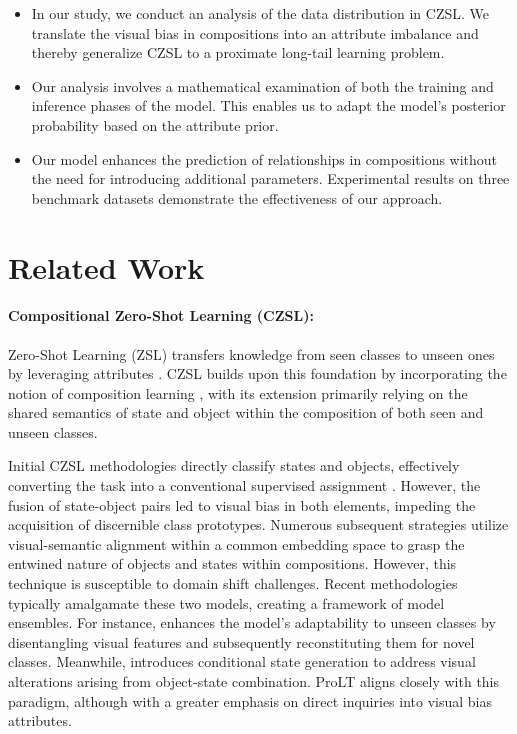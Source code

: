 \documentclass[letterpaper]{article} %
\theoremstyle{definition}
\begin{document}
\begin{itemize}
\item In our study, we conduct an analysis of the data distribution in CZSL. We translate the visual bias in compositions into an attribute imbalance and thereby generalize CZSL to a proximate long-tail learning problem.
\item Our analysis involves a mathematical examination of both the training and inference phases of the model. This enables us to adapt the model's posterior probability based on the attribute prior.
\item Our model enhances the prediction of relationships in compositions without the need for introducing additional parameters. Experimental results on three benchmark datasets demonstrate the effectiveness of our approach.
\end{itemize}


\section{Related Work} \label{sec.related}

\paragraph{Compositional Zero-Shot Learning (CZSL):} Zero-Shot Learning (ZSL) transfers knowledge from seen classes to unseen ones by leveraging attributes \cite{akata2013label, lampert2013attribute, parikh2011relative, frome2013devise, akata2015evaluation}. CZSL \cite{atzmon2020causal, yang2022decomposable,nagarajan2018attributes,wang2019task} builds upon this foundation by incorporating the notion of composition learning \cite{hoffman1984parts}, with its extension primarily relying on the shared semantics of state and object within the composition of both seen and unseen classes.

Initial CZSL methodologies directly classify states and objects, effectively converting the task into a conventional supervised assignment \cite{misra2017red, chen2014inferring, yang2020learning,lu2016visual,li2022siamese}. However, the fusion of state-object pairs led to visual bias in both elements, impeding the acquisition of discernible class prototypes. Numerous subsequent strategies utilize visual-semantic alignment within a common embedding space \cite{naeem2021learning,mancini2022learning,mancini2021open} to grasp the entwined nature of objects and states within compositions. However, this technique is susceptible to domain shift challenges. Recent methodologies typically amalgamate these two models, creating a framework of model ensembles. For instance, \citet{saini2022disentangling} enhances the model's adaptability to unseen classes by disentangling visual features and subsequently reconstituting them for novel classes. Meanwhile, \citet{wang2023learning} introduces conditional state generation to address visual alterations arising from object-state combination. ProLT aligns closely with this paradigm, although with a greater emphasis on direct inquiries into visual bias attributes.
\end{document}
